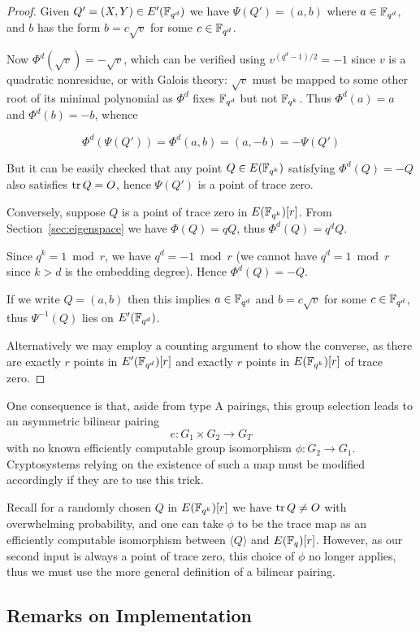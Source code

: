 \begin{proof}
Given $Q' = (X,Y) \in E'(\mathbb{F}_{q^d})$ we have $\Psi(Q') = (a, b)$
where $a \in \mathbb{F}_{q^d}$, and $b$ has the form $b = c \sqrt{v}$ for some
$c \in \mathbb{F}_{q^d}$.

Now $\Phi^d(\sqrt{v}) = -\sqrt{v}$, which
can be verified using
$v^{(q^d - 1)/2} = -1$ since $v$ is a quadratic nonresidue, or
with Galois theory: $\sqrt{v}$ must
be mapped to some other root of its minimal polynomial as $\Phi^d$ fixes
$\mathbb{F}_{q^d}$ but not $\mathbb{F}_{q^k}$.
Thus $\Phi^d(a) = a$ and $\Phi^d(b) = -b$, whence

\[ \Phi^d(\Psi(Q')) = \Phi^d(a,b) = (a, -b) = -\Psi(Q') \]

But it can be easily checked that
any point $Q \in E(\mathbb{F}_{q^k})$ satisfying $\Phi^d(Q) = -Q$ also satisfies
$\mathop{\rm tr} Q = O$, hence $\Psi(Q')$ is a point of trace zero.

Conversely, suppose $Q$ is a point of trace zero in $E(\mathbb{F}_{q^k})[r]$.
From Section~\ref{sec:eigenspace} we have $\Phi(Q) = q Q$,
thus $\Phi^d(Q) = q^d Q$.

Since $q^k = 1 \bmod r$, we have $q^d = -1 \bmod r$ (we cannot
have $q^d = 1 \bmod r$ since $k > d$ is the embedding degree).
Hence $\Phi^d(Q) = -Q$.

If we write $Q=(a,b)$ then this implies $a \in \mathbb{F}_{q^d}$ and $b = c \sqrt{v}$
for some $c \in \mathbb{F}_{q^d}$, thus $\Psi^{-1}(Q)$ lies on $E'(\mathbb{F}_{q^d})$.

Alternatively we may employ a counting argument to show the converse,
as there are exactly
$r$ points in $E'(\mathbb{F}_{q^d})[r]$ and exactly $r$ points in $E(\mathbb{F}_{q^k})[r]$ of trace
zero.
\end{proof}

One consequence is that, aside from type A pairings,
this group selection leads to an asymmetric bilinear pairing
\[
e:G_1 \times G_2 \rightarrow G_T
\]
with no known efficiently computable group isomorphism
$\phi : G_2 \rightarrow G_1$. Cryptosystems relying on the existence of
such a map must be modified accordingly if they are to use this trick.

Recall for a randomly chosen $Q$ in $E(\mathbb{F}_{q^k})[r]$ we have $\mathop{\rm tr} Q \ne O$ with
overwhelming probability, and one can take $\phi$ to be the trace map
as an efficiently computable isomorphism between $\langle Q \rangle$
and $E(\mathbb{F}_q)[r]$. However, as our second input is always a point of trace zero,
this choice of $\phi$ no longer applies,
thus we must use the more general definition
of a bilinear pairing.

\subsection {\label{sec:twistcurveremarks}Remarks on Implementation}

